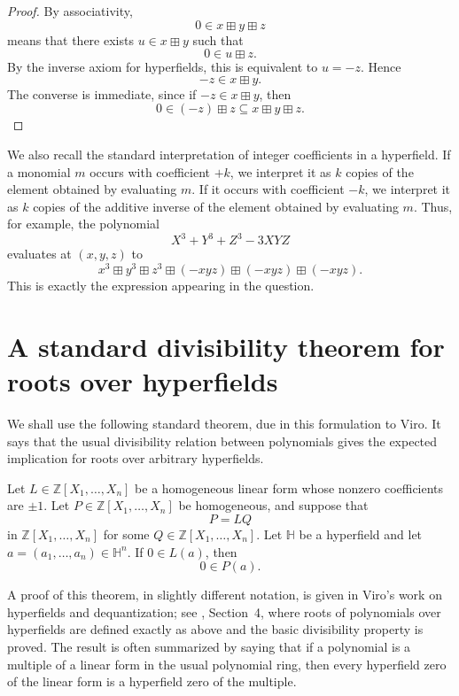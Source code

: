 \begin{proof}
By associativity,
\[
0\in x\boxplus y\boxplus z
\]
means that there exists \(u\in x\boxplus y\) such that
\[
0\in u\boxplus z.
\]
By the inverse axiom for hyperfields, this is equivalent to \(u=-z\). Hence
\[
-z\in x\boxplus y.
\]
The converse is immediate, since if \(-z\in x\boxplus y\), then
\[
0\in (-z)\boxplus z\subseteq x\boxplus y\boxplus z.
\]
\end{proof}

We also recall the standard interpretation of integer coefficients in a hyperfield. If a monomial \(m\) occurs with coefficient \(+k\), we interpret it as \(k\) copies of the element obtained by evaluating \(m\). If it occurs with coefficient \(-k\), we interpret it as \(k\) copies of the additive inverse of the element obtained by evaluating \(m\). Thus, for example, the polynomial
\[
X^{3}+Y^{3}+Z^{3}-3XYZ
\]
evaluates at \((x,y,z)\) to
\[
x^{3}\boxplus y^{3}\boxplus z^{3}
\boxplus(-xyz)\boxplus(-xyz)\boxplus(-xyz).
\]
This is exactly the expression appearing in the question.

\section{A standard divisibility theorem for roots over hyperfields}

We shall use the following standard theorem, due in this formulation to Viro. It says that the usual divisibility relation between polynomials gives the expected implication for roots over arbitrary hyperfields.

\begin{theorem}\label{thm:viro}
Let \(L\in\mathbb Z[X_1,\dots,X_n]\) be a homogeneous linear form whose nonzero coefficients are \(\pm1\). Let \(P\in\mathbb Z[X_1,\dots,X_n]\) be homogeneous, and suppose that
\[
P=LQ
\]
in \(\mathbb Z[X_1,\dots,X_n]\) for some \(Q\in\mathbb Z[X_1,\dots,X_n]\). Let \(\mathbb H\) be a hyperfield and let \(a=(a_1,\dots,a_n)\in\mathbb H^n\). If \(0\in L(a)\), then
\[
0\in P(a).
\]
\end{theorem}

A proof of this theorem, in slightly different notation, is given in Viro's work on hyperfields and dequantization; see \cite{Viro}, Section~4, where roots of polynomials over hyperfields are defined exactly as above and the basic divisibility property is proved. The result is often summarized by saying that if a polynomial is a multiple of a linear form in the usual polynomial ring, then every hyperfield zero of the linear form is a hyperfield zero of the multiple.

